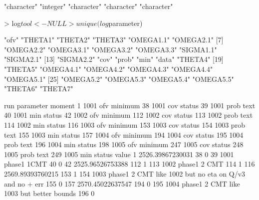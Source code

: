\begin{Schunk}
\begin{Soutput}
"character"   "integer" "character" "character" "character" 
\end{Soutput}
\begin{Sinput}
> log$tool <- NULL
> unique(log$parameter)
\end{Sinput}
\begin{Soutput}
 [1] "ofv"      "THETA1"   "THETA2"   "THETA3"   "OMEGA1.1" "OMEGA2.1"
 [7] "OMEGA2.2" "OMEGA3.1" "OMEGA3.2" "OMEGA3.3" "SIGMA1.1" "SIGMA2.1"
[13] "SIGMA2.2" "cov"      "prob"     "min"      "data"     "THETA4"  
[19] "THETA5"   "OMEGA4.1" "OMEGA4.2" "OMEGA4.3" "OMEGA4.4" "OMEGA5.1"
[25] "OMEGA5.2" "OMEGA5.3" "OMEGA5.4" "OMEGA5.5" "THETA6"   "THETA7"  
\end{Soutput}
\begin{Soutput}
     run parameter  moment
1   1001       ofv minimum
38  1001       cov  status
39  1001      prob    text
40  1001       min  status
42  1002       ofv minimum
112 1002       cov  status
113 1002      prob    text
114 1002       min  status
116 1003       ofv minimum
153 1003       cov  status
154 1003      prob    text
155 1003       min  status
157 1004       ofv minimum
194 1004       cov  status
195 1004      prob    text
196 1004       min  status
198 1005       ofv minimum
247 1005       cov  status
248 1005      prob    text
249 1005       min  status
                                                          value
1                                              2526.39867230031
38                                                            0
39                                             1001 phase1 1CMT
40                                                            0
42                                             2525.96526753388
112                                                           1
113                                           1002 phase1 2 CMT
114                                                           1
116                                            2569.89393760215
153                                                           1
154 1003 phase1 2 CMT like 1002 but no eta on Q/v3 and no + err
155                                                           0
157                                            2570.45022637547
194                                                           0
195               1004 phase1 2 CMT like 1003 but better bounds
196                                                           0

\end{Soutput}
\end{Schunk}
